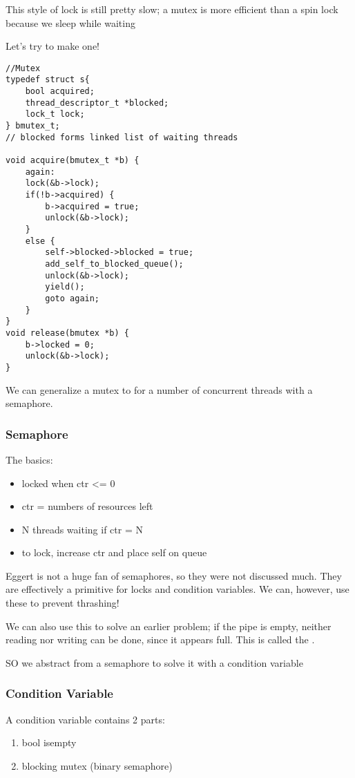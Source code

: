 \documentclass[../../lecture_notes.tex]{subfiles}
\begin{document}
This style of lock is still pretty slow; a mutex is more efficient than a spin lock because we sleep while waiting

Let’s try to make one!
\begin{lstlisting}
//Mutex
typedef struct s{
	bool acquired;
	thread_descriptor_t *blocked;
	lock_t lock;
} bmutex_t;
// blocked forms linked list of waiting threads

void acquire(bmutex_t *b) {
	again:
	lock(&b->lock);
	if(!b->acquired) {
		b->acquired = true;
		unlock(&b->lock);
	}
	else {
		self->blocked->blocked = true;
		add_self_to_blocked_queue();
		unlock(&b->lock);
		yield();
		goto again;
	}
}
void release(bmutex *b) {
	b->locked = 0;
	unlock(&b->lock);
}
\end{lstlisting}

We can generalize a mutex to for a number of concurrent threads with a semaphore.

\subsubsection*{Semaphore}

The basics:
\begin{itemize}
\item locked when ctr <= 0
\item ctr = numbers of resources left
\item N threads waiting if ctr = N
\item to lock, increase ctr and place self on queue
\end{itemize}


Eggert is not a huge fan of semaphores, so they were not discussed much. They are effectively a primitive for locks and condition variables. We can, however, use these to prevent thrashing!

We can also use this to solve an earlier problem; if the pipe is empty, neither reading nor writing can be done, since it appears full. This is called the .

SO we abstract from a semaphore to solve it with a condition variable


\subsubsection*{Condition Variable}

A condition variable contains 2 parts:
\begin{enumerate}
\item bool isempty
\item blocking mutex (binary semaphore)
\end{enumerate}
\end{document}
